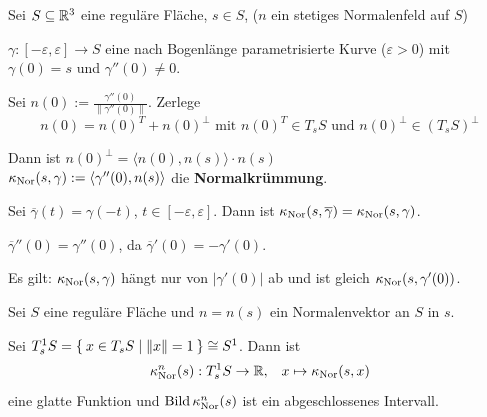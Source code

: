 \begin{definition}\label{def:18.4}%
    Sei $S \subseteq \mathbb{R}^3$ eine reguläre Fläche, $s \in S$, ($n$ ein
    stetiges Normalenfeld auf $S$)

    $\gamma:[-\varepsilon, \varepsilon] \rightarrow S$ eine nach
    Bogenlänge parametrisierte Kurve ($\varepsilon > 0$) mit
    $\gamma(0) = s$ und $\gamma''(0) \neq 0$.

    Sei $n(0) := \frac{\gamma''(0)}{\|\gamma''(0)\|}$. Zerlege
    \[n(0) = n(0)^T + n(0)^\perp \text{ mit } n(0)^T \in T_s S \text{ und } n(0)^\perp \in (T_s S)^\perp\]

    Dann ist $n(0)^\perp = \langle n(0), n(s) \rangle \cdot n(s)$\\
    $\kappa_{\textnormal{Nor}}(s, \gamma) := \langle \gamma''(0), n(s) \rangle$
    die \textbf{Normalkrümmung}.
\end{definition}

\begin{bemerkung}
    Sei $\overline{\gamma}(t) = \gamma(-t)$, $t \in [- \varepsilon, \varepsilon]$.
    Dann ist $\kappa_{\textnormal{Nor}}(s, \overline{\gamma}) = \kappa_{\textnormal{Nor}}(s, \gamma)$.
\end{bemerkung}

\begin{beweis}
    $\overline{\gamma}''(0) = \gamma''(0)$, da $\overline{\gamma}'(0) = - \gamma'(0)$.

    Es gilt: $\kappa_{\textnormal{Nor}}(s,\gamma)$ hängt nur von $|\gamma'(0)|$ ab
    und ist gleich $\kappa_{\textnormal{Nor}}(s, \gamma'(0))$.
\end{beweis}

\begin{bemerkung}%
    Sei $S$ eine reguläre Fläche und $n=n(s)$ ein Normalenvektor an 
    $S$ in $s$.

    Sei $T_{s}^{1} S = \Set{x \in T_s S | \|x\| = 1} \cong S^1$.
    Dann ist 
    \[ \kappa_{\textnormal{Nor}}^n(s): T^1_s S \rightarrow \mathbb{R}, \;\;\; x \mapsto \kappa_{\textnormal{Nor}}(s,x)\]
    eine glatte Funktion und 
    $\operatorname{Bild} \kappa_{\textnormal{Nor}}^n(s)$ ist ein abgeschlossenes Intervall.
\end{bemerkung}

